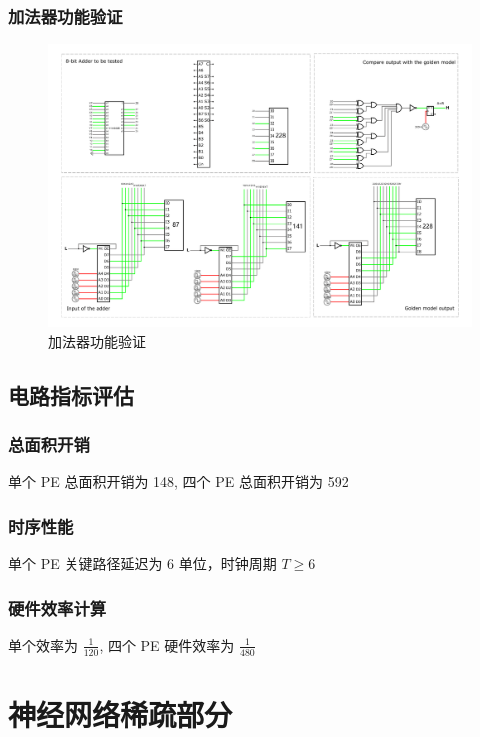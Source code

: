 \documentclass{article}
\begin{document}
\subsubsection{加法器功能验证}

\begin{figure}[H]
    \centering
    \includegraphics[width=1\textwidth]{加法器验证.pdf}
    \caption{加法器功能验证}
\end{figure}

\subsection{电路指标评估}

\subsubsection{总面积开销}

单个 PE 总面积开销为 148, 四个 PE 总面积开销为 592

\subsubsection{时序性能}

单个 PE 关键路径延迟为 6 单位，时钟周期 $T \geq 6$

\subsubsection{硬件效率计算}

单个效率为 $\frac{1}{120}$, 四个 PE 硬件效率为 $\frac{1}{480}$

\section{神经网络稀疏部分}
\end{document}
